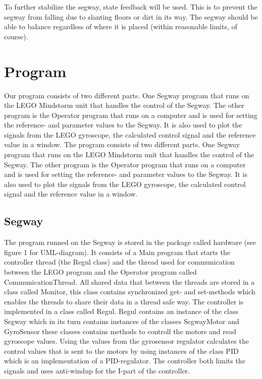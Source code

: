 To further stabilize the segway, state feedback will be used. This is to prevent the segway from falling due to slanting floors or dirt in its way. The segway should be able to balance regardless of where it is placed (within reasonable limits, of course).


\section{Program}
Our program consists of two different parts. One Segway program that runs on the LEGO Mindstorm unit that handles the control of the Segway. The other program is the Operator program that runs on a computer and is used for setting the reference- and parameter values to the Segway. It is also used to plot the signals from the LEGO gyroscope, the calculated control signal and the reference value in a window. 
The program consists of two different parts. One Segway program that runs on the LEGO Mindstorm unit that handles the control of the Segway. The other program is the Operator program that runs on a computer and is used for setting the reference- and parameter values to the Segway. It is also used to plot the signals from the LEGO gyroscope, the calculated control signal and the reference value in a window. %

\subsection{Segway}
The program runned on the Segway is stored in the package called hardware (see figure 1 for UML-diagram). It consists of a Main program that starts the controller thread (the Regul class) and the thread used for communication between the LEGO program and the Operator program called CommunicationThread. All shared data that between the threads are stored in a class called Monitor, this class contains synchronized get- and set-methods which enables the threads to share their data in a thread safe way. The controller is implemented in a class called Regul. Regul contains an instance of the class Segway which in its turn contains instances of the classes SegwayMotor and GyroSensor these classes contains methods to controll the motors and read gyroscope values. Using the values from the gyrosensor regulator calculates the control values that is sent to the motors by using instances of the class PID which is an implementation of a PID-regulator. The controller both limits the signals and uses anti-windup for the I-part of the controller. 


